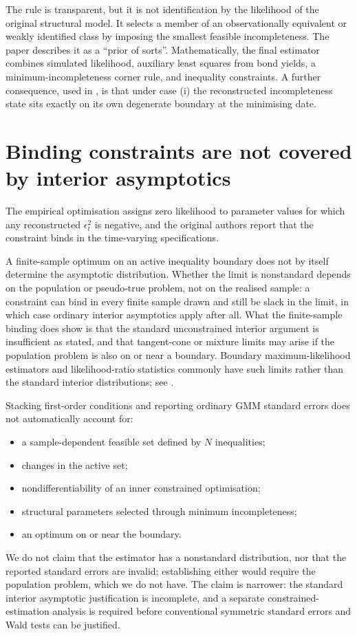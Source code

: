 \documentclass[11pt]{article}
\theoremstyle{definition}
\begin{document}
The rule is transparent, but it is not identification by the likelihood of the original structural model. It selects a member of an observationally equivalent or weakly identified class by imposing the smallest feasible incompleteness. The paper describes it as a ``prior of sorts''. Mathematically, the final estimator combines simulated likelihood, auxiliary least squares from bond yields, a minimum-incompleteness corner rule, and inequality constraints. A further consequence, used in , is that under case (i) the reconstructed incompleteness state sits exactly on its own degenerate boundary at the minimising date.

\FloatBarrier
\section{Binding constraints are not covered by interior asymptotics}\label{app:constrained}

The empirical optimisation assigns zero likelihood to parameter values for which any reconstructed $\epsilon_t^2$ is negative, and the original authors report that the constraint binds in the time-varying specifications.

A finite-sample optimum on an active inequality boundary does not by itself determine the asymptotic distribution. Whether the limit is nonstandard depends on the population or pseudo-true problem, not on the realised sample: a constraint can bind in every finite sample drawn and still be slack in the limit, in which case ordinary interior asymptotics apply after all. What the finite-sample binding does show is that the standard unconstrained interior argument is insufficient as stated, and that tangent-cone or mixture limits may arise if the population problem is also on or near a boundary. Boundary maximum-likelihood estimators and likelihood-ratio statistics commonly have such limits rather than the standard interior distributions; see \citet{SelfLiang1987}.

Stacking first-order conditions and reporting ordinary GMM standard errors does not automatically account for:
\begin{itemize}
\item a sample-dependent feasible set defined by $N$ inequalities;
\item changes in the active set;
\item nondifferentiability of an inner constrained optimisation;
\item structural parameters selected through minimum incompleteness;
\item an optimum on or near the boundary.
\end{itemize}
We do not claim that the estimator has a nonstandard distribution, nor that the reported standard errors are invalid; establishing either would require the population problem, which we do not have. The claim is narrower: the standard interior asymptotic justification is incomplete, and a separate constrained-estimation analysis is required before conventional symmetric standard errors and Wald tests can be justified.

\FloatBarrier
\printbibliography
\end{document}

